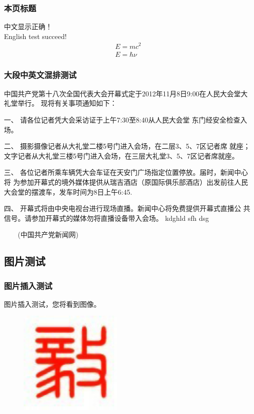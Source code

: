 \documentclass[presentation]{beamer}
\newcommand*{\myblue}[1]{\textcolor{myblue}{#1}}
\newcommand*{\myred}[1]{\textcolor{myred}{#1}}
\begin{document}
\begin{frame}
  \frametitle{本页标题}
  {\kai 中文显示正确！}\\
  English test succeed!\\
  \begin{align}\label{eq:ei}
    E=mc^2\\
    E=\hbar \nu
  \end{align}
\end{frame}
\begin{frame}[allowframebreaks]
\frametitle{大段中英文混排测试}
\song 中国共产党第十八次全国代表大会开幕式定于\myred{2012年11月8日9:00}在\myblue{人民大会堂大礼堂}举行。
现将有关事项通知如下：


一、 请各位记者凭大会采访证于上午7:30至8:40从人民大会堂
东门经安全检查入场。


二、 摄影摄像记者从大礼堂二楼5号门进入会场，在二层3、5、7区记者席
就座；文字记者从大礼堂三楼5号门进入会场，在三层大礼堂3、5、7区记者席就座。


三、 各位记者所乘车辆凭大会车证在天安门广场指定位置停放。届时，新闻中心将
为参加开幕式的境外媒体提供从瑞吉酒店（\alert{原国际俱乐部酒店}）出发前往人民
大会堂的摆渡车，发车时间为8日上午6:45.


四、 开幕式将由中央电视台进行现场直播。新闻中心将免费提供开幕式直播公
共信号。请参加开幕式的媒体勿将直播设备带入会场。
kdghld sfh dsg

　　(中国共产党新闻网)
\end{frame}

\subsection{图片测试}

\begin{frame}
\frametitle{图片插入测试}
图片插入测试，您将看到图像。
\begin{figure}
\centering
  \includegraphics[width=5cm]{logo.jpeg}
\end{figure}
\end{frame}
\end{document}
